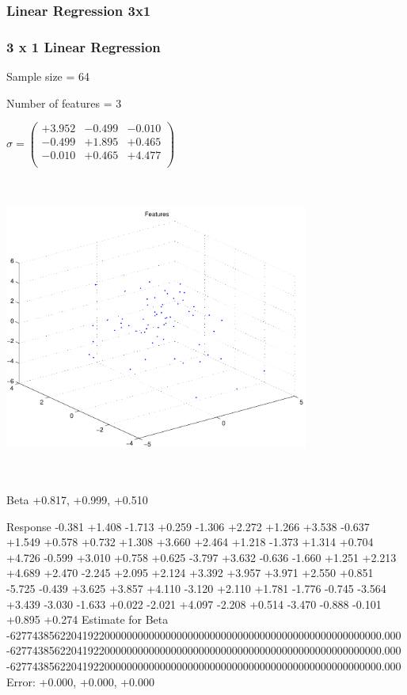 \documentclass[9pt]{article}
\theoremstyle{plain}
\theoremstyle{definition}
\theoremstyle{remark}
\numberwithin{equation}{section}
\begin{document}
\subsubsection{Linear Regression 3x1}
\subsubsection{3 x 1 Linear Regression}
Sample size = 64

Number of features = 3

$\sigma = \left(
\begin{array}{
ccc}
+3.952 & -0.499 & -0.010 \\
-0.499 & +1.895 & +0.465 \\
-0.010 & +0.465 & +4.477 \\
\end{array}
\right)$ \newline 

\includegraphics[width=10.0cm,height=10.0cm]{regression_features.pdf}

Beta
+0.817, +0.999, +0.510

Response
-0.381
+1.408
-1.713
+0.259
-1.306
+2.272
+1.266
+3.538
-0.637
+1.549
+0.578
+0.732
+1.308
+3.660
+2.464
+1.218
-1.373
+1.314
+0.704
+4.726
-0.599
+3.010
+0.758
+0.625
-3.797
+3.632
-0.636
-1.660
+1.251
+2.213
+4.689
+2.470
-2.245
+2.095
+2.124
+3.392
+3.957
+3.971
+2.550
+0.851
-5.725
-0.439
+3.625
+3.857
+4.110
-3.120
+2.110
+1.781
-1.776
-0.745
-3.564
+3.439
-3.030
-1.633
+0.022
-2.021
+4.097
-2.208
+0.514
-3.470
-0.888
-0.101
+0.895
+0.274
Estimate for Beta
-6277438562204192200000000000000000000000000000000000000000000000000.000
-6277438562204192200000000000000000000000000000000000000000000000000.000
-6277438562204192200000000000000000000000000000000000000000000000000.000
Error:
+0.000, +0.000, +0.000
\end{document}
